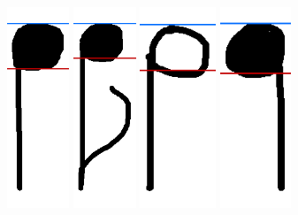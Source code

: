 \begin{figure}[h!]
    \centering
    \includegraphics[height=6cm]{gfx/techniques/scoring/note-stem-down/1747.png}
    \quad
    \includegraphics[height=6cm]{gfx/techniques/scoring/note-stem-down/2996.png}
    \quad
    \includegraphics[height=6cm]{gfx/techniques/scoring/note-stem-down/5327.png}
    \quad
    \includegraphics[height=6cm]{gfx/techniques/scoring/note-stem-down/5376.png}

\end{figure}
